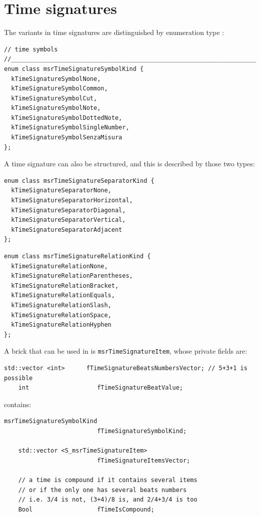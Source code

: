 \section{Time signatures}\label{Time signatures}

The variants in time signatures are distinguished by enumeration type :
\begin{lstlisting}[language=CPlusPlus]
// time symbols
//______________________________________________________________________________
enum class msrTimeSignatureSymbolKind {
  kTimeSignatureSymbolNone,
  kTimeSignatureSymbolCommon,
  kTimeSignatureSymbolCut,
  kTimeSignatureSymbolNote,
  kTimeSignatureSymbolDottedNote,
  kTimeSignatureSymbolSingleNumber,
  kTimeSignatureSymbolSenzaMisura
};
\end{lstlisting}

A time signature can also be structured, and this is described by those two types:
\begin{lstlisting}[language=CPlusPlus]
enum class msrTimeSignatureSeparatorKind {
  kTimeSignatureSeparatorNone,
  kTimeSignatureSeparatorHorizontal,
  kTimeSignatureSeparatorDiagonal,
  kTimeSignatureSeparatorVertical,
  kTimeSignatureSeparatorAdjacent
};
\end{lstlisting}

\begin{lstlisting}[language=CPlusPlus]
enum class msrTimeSignatureRelationKind {
  kTimeSignatureRelationNone,
  kTimeSignatureRelationParentheses,
  kTimeSignatureRelationBracket,
  kTimeSignatureRelationEquals,
  kTimeSignatureRelationSlash,
  kTimeSignatureRelationSpace,
  kTimeSignatureRelationHyphen
};
\end{lstlisting}

A brick that can be used in  is {\tt msrTimeSignatureItem}, whose private fields are:
\begin{lstlisting}[language=CPlusPlus]
    std::vector <int>      fTimeSignatureBeatsNumbersVector; // 5+3+1 is possible
    int                   fTimeSignatureBeatValue;
\end{lstlisting}

 contains:
\begin{lstlisting}[language=CPlusPlus]
    msrTimeSignatureSymbolKind
                          fTimeSignatureSymbolKind;

    std::vector <S_msrTimeSignatureItem>
                          fTimeSignatureItemsVector;

    // a time is compound if it contains several items
    // or if the only one has several beats numbers
    // i.e. 3/4 is not, (3+4)/8 is, and 2/4+3/4 is too
    Bool                  fTimeIsCompound;
\end{lstlisting}


